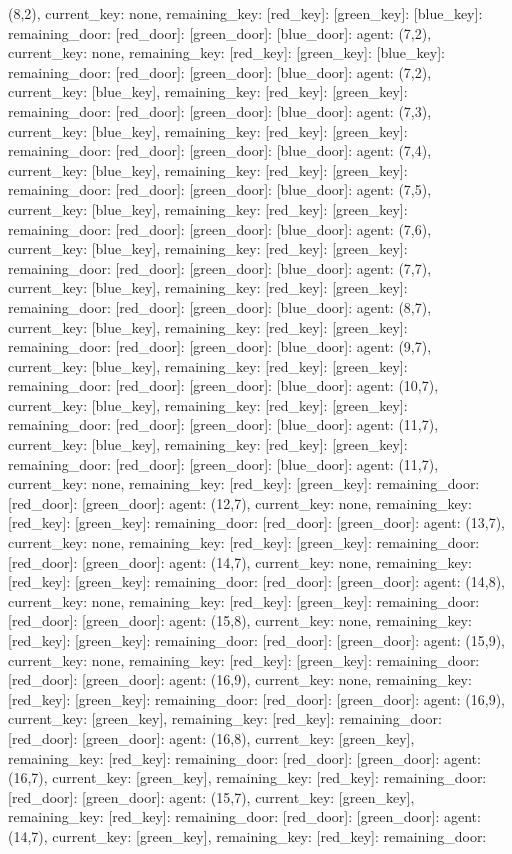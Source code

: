 \begin{tcolorbox}[title=Response (CoT and Answer), colback=white]
(8,2), current\_key: none, remaining\_key: [red\_key]: [green\_key]: [blue\_key]: remaining\_door: [red\_door]: [green\_door]: [blue\_door]:  agent: (7,2), current\_key: none, remaining\_key: [red\_key]: [green\_key]: [blue\_key]: remaining\_door: [red\_door]: [green\_door]: [blue\_door]:  agent: (7,2), current\_key: [blue\_key], remaining\_key: [red\_key]: [green\_key]: remaining\_door: [red\_door]: [green\_door]: [blue\_door]:  agent: (7,3), current\_key: [blue\_key], remaining\_key: [red\_key]: [green\_key]: remaining\_door: [red\_door]: [green\_door]: [blue\_door]:  agent: (7,4), current\_key: [blue\_key], remaining\_key: [red\_key]: [green\_key]: remaining\_door: [red\_door]: [green\_door]: [blue\_door]:  agent: (7,5), current\_key: [blue\_key], remaining\_key: [red\_key]: [green\_key]: remaining\_door: [red\_door]: [green\_door]: [blue\_door]:  agent: (7,6), current\_key: [blue\_key], remaining\_key: [red\_key]: [green\_key]: remaining\_door: [red\_door]: [green\_door]: [blue\_door]:  agent: (7,7), current\_key: [blue\_key], remaining\_key: [red\_key]: [green\_key]: remaining\_door: [red\_door]: [green\_door]: [blue\_door]:  agent: (8,7), current\_key: [blue\_key], remaining\_key: [red\_key]: [green\_key]: remaining\_door: [red\_door]: [green\_door]: [blue\_door]:  agent: (9,7), current\_key: [blue\_key], remaining\_key: [red\_key]: [green\_key]: remaining\_door: [red\_door]: [green\_door]: [blue\_door]:  agent: (10,7), current\_key: [blue\_key], remaining\_key: [red\_key]: [green\_key]: remaining\_door: [red\_door]: [green\_door]: [blue\_door]:  agent: (11,7), current\_key: [blue\_key], remaining\_key: [red\_key]: [green\_key]: remaining\_door: [red\_door]: [green\_door]: [blue\_door]:  agent: (11,7), current\_key: none, remaining\_key: [red\_key]: [green\_key]: remaining\_door: [red\_door]: [green\_door]:  agent: (12,7), current\_key: none, remaining\_key: [red\_key]: [green\_key]: remaining\_door: [red\_door]: [green\_door]:  agent: (13,7), current\_key: none, remaining\_key: [red\_key]: [green\_key]: remaining\_door: [red\_door]: [green\_door]:  agent: (14,7), current\_key: none, remaining\_key: [red\_key]: [green\_key]: remaining\_door: [red\_door]: [green\_door]:  agent: (14,8), current\_key: none, remaining\_key: [red\_key]: [green\_key]: remaining\_door: [red\_door]: [green\_door]:  agent: (15,8), current\_key: none, remaining\_key: [red\_key]: [green\_key]: remaining\_door: [red\_door]: [green\_door]:  agent: (15,9), current\_key: none, remaining\_key: [red\_key]: [green\_key]: remaining\_door: [red\_door]: [green\_door]:  agent: (16,9), current\_key: none, remaining\_key: [red\_key]: [green\_key]: remaining\_door: [red\_door]: [green\_door]:  agent: (16,9), current\_key: [green\_key], remaining\_key: [red\_key]: remaining\_door: [red\_door]: [green\_door]:  agent: (16,8), current\_key: [green\_key], remaining\_key: [red\_key]: remaining\_door: [red\_door]: [green\_door]:  agent: (16,7), current\_key: [green\_key], remaining\_key: [red\_key]: remaining\_door: [red\_door]: [green\_door]:  agent: (15,7), current\_key: [green\_key], remaining\_key: [red\_key]: remaining\_door: [red\_door]: [green\_door]:  agent: (14,7), current\_key: [green\_key], remaining\_key: [red\_key]: remaining\_door: 
\end{tcolorbox}
